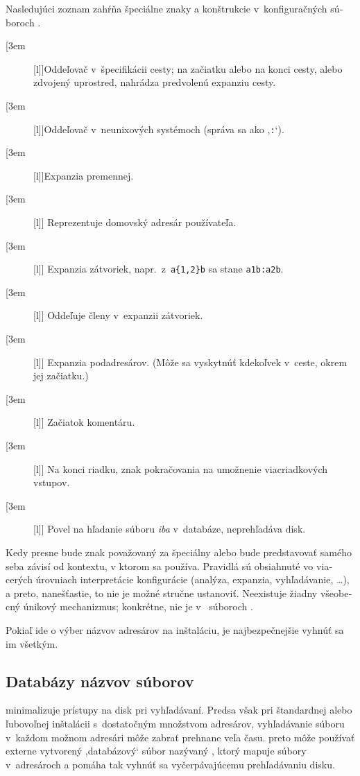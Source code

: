 \documentclass[\classoptions,slovak,english,czech]{\classname}
\newcommand{\singleuv}[1]{,#1`}
\begin{document}
\begin{otherlanguage}{slovak}
Nasledujúci zoznam zahŕňa špeciálne znaky a konštrukcie v~konfiguračných
súboroch \KPS{}.

\newcommand{\CODE}[1]{\makebox[3em][l]{\code{#1}}}
\begin{description}
\item[\CODE{:}]Oddeľovač v~špecifikácii cesty; na začiatku alebo
  na konci cesty, alebo zdvojený uprostred, nahrádza predvolenú expanziu cesty.\par
\item[\CODE{;}]Oddeľovač v~neunixových systémoch (správa sa ako
   \singleuv{\texttt{:}}).
\item[\CODE{\$}]Expanzia premennej.
\item[\CODE{\string~}] Reprezentuje domovský adresár používateľa.
\item[\CODE{\char`\{...\char`\}}] Expanzia zátvoriek, napr.\
  z~\verb+a{1,2}b+ sa stane \verb+a1b:a2b+.
\item[\CODE{,}] Oddeľuje členy v~expanzii zátvoriek.
\item[\CODE{//}] Expanzia podadresárov. (Môže sa
  vyskytnúť kdekoľvek v~ceste, okrem jej začiatku.)
\item[\CODE{\%}] Začiatok komentáru.
\item[\CODE{\bs}] Na konci riadku, znak pokračovania na umožnenie viacriadkových vstupov.
\item[\CODE{!!}] Povel na hľadanie súboru \emph{iba} v~databáze,
  neprehľadáva disk.
\end{description}

Kedy presne bude znak považovaný za špeciálny alebo bude predstavovať 
samého seba závisí od kontextu, v ktorom sa používa. Pravidlá sú obsiahnuté vo
viacerých úrovniach interpretácie konfigurácie (analýza,
expanzia, vyhľadávanie, \ldots), a preto, nanešťastie, to nie je možné stručne ustanoviť. 
Neexistuje žiadny všeobecný únikový mechanizmus; konkrétne,
\samp{\bs} nie je  v~ súboroch .

Pokiaľ ide o výber názvov adresárov na inštaláciu, je najbezpečnejšie
vyhnúť sa im všetkým.

\subsection{Databázy názvov súborov}
\label{sec:filename.database}

\KPS{} minimalizuje prístupy na disk pri vyhľadávaní. Predsa však
pri štandardnej alebo ľubovoľnej inštalácii 
s~dostatočným množstvom adresárov, vyhľadávanie súboru
v~každom možnom adresári môže zabrať prehnane veľa času.
\KPS{} preto môže používať externe vytvorený \singleuv{databázový} súbor
nazývaný \file{ls-R}, ktorý mapuje súbory v~adresároch a pomáha tak
vyhnúť sa vyčerpávajúcemu prehľadávaniu disku.


\end{otherlanguage}
\end{document}

